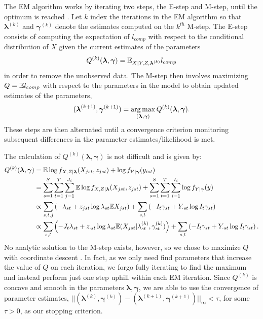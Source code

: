 The EM algorithm works by iterating two steps, the E-step and M-step, until the optimum is reached \citep{Dempster:1977,McLachlan:2007}.  Let $k$ index the iterations in the EM algorithm so that $\boldsymbol \lambda^{(k)}$ and $\boldsymbol \gamma^{(k)}$ denote the estimates computed on the $k^{th}$ M-step. The E-step consists of computing the expectation of $l_{comp}$ with respect to the conditional distribution of $X$ given the current estimates of the parameters
\[
Q^{(k)}(\boldsymbol{\lambda},\boldsymbol{\gamma}) = \mathbb{E}_{X|Y,Z,\boldsymbol{\lambda}^{(k)}} l_{comp}
\]
in order to remove the unobserved data. The M-step then involves maximizing $Q = \mathbb{E} l_{comp}$ with respect to the parameters in the model to obtain updated estimates of the parameters,
\[
(\boldsymbol{\lambda}^{(k+1)}, \boldsymbol{\gamma}^{(k+1)}) = \operatorname*{arg\,max}_{(\boldsymbol{\lambda}, \boldsymbol{\gamma})} Q^{(k)}(\boldsymbol{\lambda}, \boldsymbol{\gamma}).
\]
These steps are then alternated until a convergence criterion monitoring subsequent differences in the parameter estimates/likelihood is met.  

The calculation of $Q^{(k)}(\boldsymbol{\lambda}, \boldsymbol{\gamma})$ is not difficult and is given by:
\begin{align}
  \label{eq:estep}
  \begin{split}
  Q^{(k)}(\boldsymbol{\lambda}, \boldsymbol{\gamma})
  & = \mathbb{E} \log{f_{X,Z|\boldsymbol{\lambda}}(X_{jst},z_{jst})} + \log{f_{Y|\boldsymbol{\gamma}}(y_{ist})} \\
  & = \sum_{s=1}^S \sum_{t=1}^T \sum_{j=1}^{J_t} \mathbb{E} \log{f_{X,Z|\boldsymbol{\lambda}}(X_{jst},z_{jst})}
  + \sum_{s=1}^S \sum_{t=1}^T \sum_{i=1}^{I_t} \log{f_{Y|\boldsymbol{\gamma}}(y)} \\
  & \propto \sum_{s,t,j} \left( - \lambda_{st} 
    + z_{jst} \log{\lambda_{st}} \mathbb{E} X_{jst} \right) + \sum_{s,t} \left( -I_t \gamma_{st} + Y_{\cdot st} \log{I_t \gamma_{st}} \right) \\
  & \propto \sum_{s,t} \left( -J_t \lambda_{st} + z_{\cdot st} \log{\lambda_{st}} \mathbb{E} (X_{jst}|\lambda_{st}^{(k)},\gamma_{st}^{(k)}) \right) + \sum_{s,t} \left( -I_t \gamma_{st} + Y_{\cdot st} \log{I_t \gamma_{st}} \right).
\end{split}
\end{align}
\noindent No analytic solution to the M-step exists, however, so we chose to maximize $Q$ with coordinate descent \citep{Luo:1992}.  In fact, as we only need find parameters that increase the value of $Q$ on each iteration, we forgo fully iterating to find the maximum and instead perform just one step uphill within each EM iteration.  Since $Q^{(k)}$ is concave and smooth in the parameters $\boldsymbol{\lambda}, \boldsymbol{\gamma}$, we are able to use the convergence of parameter estimates, $||(\boldsymbol{\lambda}^{(k)}, \boldsymbol{\gamma}^{(k)}) - (\boldsymbol{\lambda}^{(k+1)}, \boldsymbol{\gamma}^{(k+1)})||_{\infty} < \tau $, for some $\tau>0$, as our stopping criterion.

